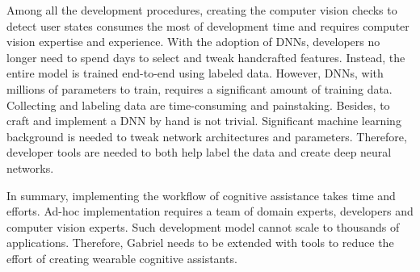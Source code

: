 Among all the development procedures, creating the computer vision checks to
detect user states consumes the most of development time and requires computer
vision expertise and experience. With the adoption of DNNs, developers no longer
need to spend days to select and tweak handcrafted features. Instead, the entire
model is trained end-to-end using labeled data. However, DNNs, with millions of
parameters to train, requires a significant amount of training data. Collecting
and labeling data are time-consuming and painstaking. Besides, to craft and
implement a DNN by hand is not trivial. Significant machine learning background
is needed to tweak network architectures and parameters. Therefore, developer
tools are needed to both help label the data and create deep neural networks.

In summary, implementing the workflow of cognitive assistance takes time and
efforts. Ad-hoc implementation requires a team of domain experts, developers and
computer vision experts. Such development model cannot scale to thousands of
applications. Therefore, Gabriel needs to be extended with tools to reduce the
effort of creating wearable cognitive assistants.

